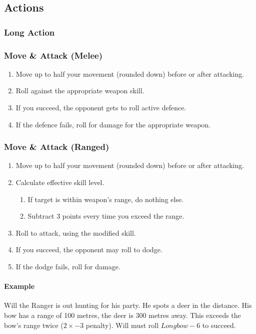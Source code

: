 \subsection{Actions}
\subsubsection{Long Action}

\subsubsection{Move \& Attack (Melee)}
\begin{enumerate}
    \item Move up to half your movement (rounded down) before or after attacking.
    \item Roll against the appropriate weapon skill.
    \item If you succeed, the opponent gets to roll active defence.
    \item If the defence fails, roll for damage for the appropriate weapon.
\end{enumerate}

\subsubsection{Move \& Attack (Ranged)}
\begin{enumerate}
    \item Move up to half your movement (rounded down) before or after attacking.
    \item Calculate effective skill level.
        \begin{enumerate}
            \item If target is within weapon's range, do nothing else.
            \item Subtract 3 points every time you exceed the range.
        \end{enumerate}
    \item Roll to attack, using the modified skill.
    \item If you succeed, the opponent may roll to dodge.
    \item If the dodge fails, roll for damage.
\end{enumerate}

\paragraph{Example} Will the Ranger is out hunting for his party. He spots a deer in the distance. His bow has a range of 100 metres, the deer is 300 metres away. This exceeds the bow's range twice ($2\times -3$ penalty). Will must roll $Longbow-6$ to succeed.

